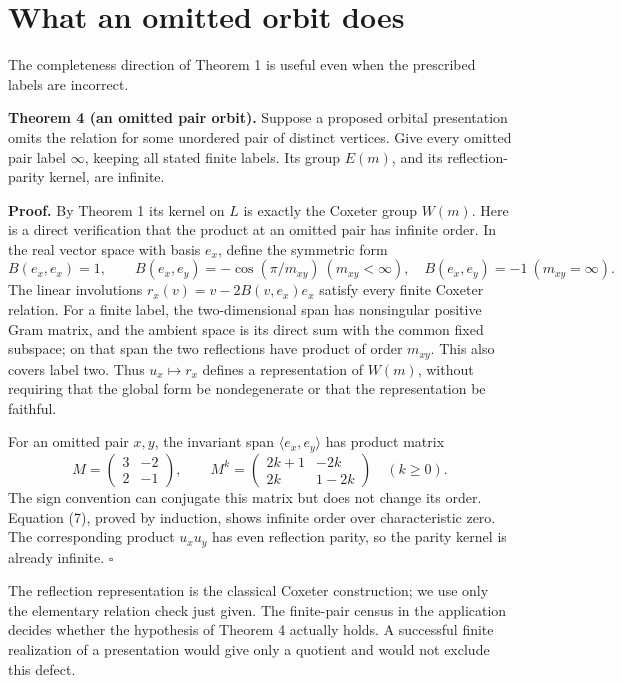\section{What an omitted orbit does}\label{what-an-omitted-orbit-does}

The completeness direction of Theorem 1 is useful even when the prescribed labels are incorrect.

\textbf{Theorem 4 (an omitted pair orbit).} Suppose a proposed orbital presentation omits the relation for some unordered pair of distinct vertices. Give every omitted pair label \(\infty\), keeping all stated finite labels. Its group \(E(m)\), and its reflection-parity kernel, are infinite.

\textbf{Proof.} By Theorem 1 its kernel on \(L\) is exactly the Coxeter group \(W(m)\). Here is a direct verification that the product at an omitted pair has infinite order. In the real vector space with basis \(e_x\), define the symmetric form
\[
 B(e_x,e_x)=1,\qquad
 B(e_x,e_y)=-\cos(\pi/m_{xy})\ (m_{xy}<\infty),
 \quad B(e_x,e_y)=-1\ (m_{xy}=\infty).
\]
The linear involutions \(r_x(v)=v-2B(v,e_x)e_x\) satisfy every finite Coxeter relation. For a finite label, the two-dimensional span has nonsingular positive Gram matrix, and the ambient space is its direct sum with the common fixed subspace; on that span the two reflections have product of order \(m_{xy}\). This also covers label two. Thus \(u_x\mapsto r_x\) defines a representation of \(W(m)\), without requiring that the global form be nondegenerate or that the representation be faithful.

For an omitted pair \(x,y\), the invariant span \(\langle e_x,e_y\rangle\) has product matrix
\[
 M=\begin{pmatrix}3&-2\\2&-1\end{pmatrix},\qquad
 M^k=\begin{pmatrix}2k+1&-2k\\2k&1-2k\end{pmatrix}
 \quad(k\ge0).                               \tag{7}
\]
The sign convention can conjugate this matrix but does not change its order. Equation (7), proved by induction, shows infinite order over characteristic zero. The corresponding product \(u_xu_y\) has even reflection parity, so the parity kernel is already infinite. $\square$

The reflection representation is the classical Coxeter construction; we use only the elementary relation check just given. The finite-pair census in the application decides whether the hypothesis of Theorem 4 actually holds. A successful finite realization of a presentation would give only a quotient and would not exclude this defect.

